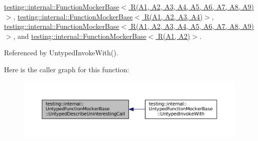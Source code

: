 \hyperlink{classtesting_1_1internal_1_1FunctionMockerBase_a9f701bc2048925f61cab0491a9aa275c}{testing\+::internal\+::\+Function\+Mocker\+Base$<$ R(\+A1, A2, A3, A4, A5, A6, A7, A8, A9)$>$}, \hyperlink{classtesting_1_1internal_1_1FunctionMockerBase_a9f701bc2048925f61cab0491a9aa275c}{testing\+::internal\+::\+Function\+Mocker\+Base$<$ R(\+A1, A2, A3, A4)$>$}, \hyperlink{classtesting_1_1internal_1_1FunctionMockerBase_a9f701bc2048925f61cab0491a9aa275c}{testing\+::internal\+::\+Function\+Mocker\+Base$<$ R(\+A1, A2, A3, A4, A5, A6, A7, A8, A9) $>$}, and \hyperlink{classtesting_1_1internal_1_1FunctionMockerBase_a9f701bc2048925f61cab0491a9aa275c}{testing\+::internal\+::\+Function\+Mocker\+Base$<$ R(\+A1, A2)$>$}.



Referenced by Untyped\+Invoke\+With().

Here is the caller graph for this function\+:
\nopagebreak
\begin{figure}[H]
\begin{center}
\leavevmode
\includegraphics[width=350pt]{classtesting_1_1internal_1_1UntypedFunctionMockerBase_a48a17fa75b744c2bfb19ee1f54d51759_icgraph}
\end{center}
\end{figure}
\mbox{\label{classtesting_1_1internal_1_1UntypedFunctionMockerBase_a38714b44836c937fe95524f8d7063d04}} 
